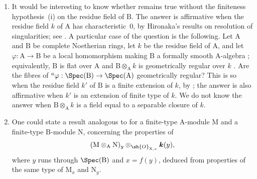 \begin{remarks}[7.5.4]
\label{IV.7.5.4}
\begin{enumerate}[label=(\roman*)]
  \item It would be interesting to know whether  remains true without the finiteness hypothesis~(i) on the residue field of $\mathrm{B}$. The answer is affirmative when the residue field $k$ of $\mathrm{A}$ has characteristic~$0$, by Hironaka's results on resolution of singularities; see . A particular case of the question is the following. Let $\mathrm{A}$ and $\mathrm{B}$ be complete Noetherian rings, let $k$ be the residue field of $\mathrm{A}$, and let $\varphi:\mathrm{A}\to\mathrm{B}$ be a local homomorphism making $\mathrm{B}$ a formally smooth $\mathrm{A}$-algebra ; equivalently, $\mathrm{B}$ is flat over $\mathrm{A}$ and $\mathrm{B}\otimes_\mathrm{A}k$ is geometrically regular over $k$ . Are the fibres of ${}^a\varphi:\Spec(\mathrm{B})\to\Spec(\mathrm{A})$ geometrically regular? This is so when the residue field $k'$ of $\mathrm{B}$ is a finite extension of $k$, by ; the answer is also affirmative when $k'$ is an extension of finite type of $k$. We do not know the answer when $\mathrm{B}\otimes_\mathrm{A}k$ is a field equal to a separable closure of $k$.

  \item One could state a result analogous to  for a finite-type $\mathrm{A}$-module $\mathrm{M}$ and a finite-type $\mathrm{B}$-module $\mathrm{N}$, concerning the properties of
  \[
    (\mathrm{M}\otimes_\mathrm{A}\mathrm{N})_y
    \otimes_{\sh{O}_{\mathrm{X},x}}\boldsymbol{k}(y),
  \]
  where $y$ runs through $\Spec(\mathrm{B})$ and $x=f(y)$, deduced from properties of the same type of $\mathrm{M}_x$ and $\mathrm{N}_y$.


\end{enumerate}
\end{remarks}
